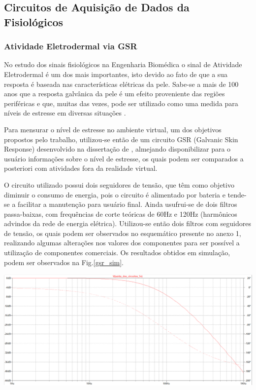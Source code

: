 \subsection{Circuitos de Aquisição de Dados da Fisiológicos}

\subsubsection{Atividade Eletrodermal via GSR}
    No estudo dos sinais fisiológicos na Engenharia Biomédica o sinal de Atividade Eletrodermal é um dos mais importantes, isto devido ao fato de que a sua resposta é baseada nas características elétricas da pele. Sabe-se a mais de 100 anos \cite{eletrodermal_1} que a resposta galvânica da pele é um efeito proveniente das regiões periféricas e que, muitas das vezes, pode ser utilizado como uma medida para níveis de estresse em diversas situações \cite{eletrodermal_2}. 

	Para mensurar o nível de estresse no ambiente virtual, um dos objetivos propostos pelo trabalho, utilizou-se então de um circuito GSR (Galvanic Skin Response) desenvolvido na dissertação de \cite{miranda2015}, almejando disponibilizar para o usuário informações sobre o nível de estresse, os quais podem ser comparados a posteriori com atividades fora da realidade virtual.

	O circuito utilizado possui dois seguidores de tensão, que têm como objetivo diminuir o consumo de energia, pois o circuito é alimentado por bateria e tende-se a facilitar a manutenção para usuário final. Ainda usufrui-se de dois filtros passa-baixas, com frequências de corte teóricas de 60Hz e 120Hz (harmônicos advindos da rede de energia elétrica). Utilizou-se então dois filtros com seguidores de tensão, os quais podem ser observados no esquemático presente no anexo 1, realizando algumas alterações nos valores dos componentes para ser possível a utilização de componentes comerciais.
	Os resultados obtidos em simulação, podem ser observados na Fig.\ref{gsr_sim}.
    
    \begin{center}
    	\includegraphics[scale=0.3]{figuras/Resultados_Simulacao_GSR}
        \label{gsr_sim}
    \end{center}
    
